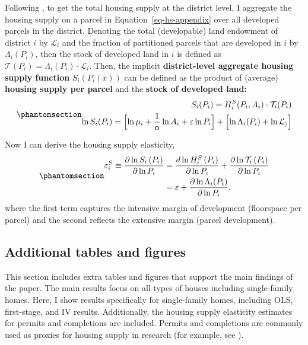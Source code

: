 \documentclass[
  12pt,
]{article}
\begin{document}
Following \citet{baum-snow_han_2019}, to get the total housing supply at
the district level, I aggregate the housing supply on a parcel in
Equation~\ref{eq-hs-appendix} over all developed parcels in the
district. Denoting the total (developable) land endowment of district
\(i\) by \(\mathcal{L}_{i}\) and the fraction of partitioned parcels
that are developed in \(i\) by \(\Lambda_i (P_i)\), then the stock of
developed land in \(i\) is defined as
\(\mathcal{T}(P_i) = \Lambda_i(P_i) \cdot \mathcal{L}_{i}\). Then, the
implicit \textbf{district-level aggregate housing supply function}
\(S_i(P_i(x))\) can be defined as the product of (average)
\textbf{housing supply per parcel} and the \textbf{stock of developed
land:} \begin{equation}\phantomsection\label{eq-agg-hs-appendix}{
\begin{aligned}
S_i(P_i) = H_i^S(P_i, A_i)\cdot \mathcal{T}_{i}(P_i)\\ 
\ln S_i(P_i) = \Bigl[\ln \mu_i + \frac{1}{\alpha}\ln A_i + \varepsilon\ln P_i \Bigr]+ \Bigl[\ln\Lambda_i(P_i) + \ln\mathcal{L_i}\Bigr]
\end{aligned}
}\end{equation}

Now I can derive the housing supply elasticity,
\begin{equation}\phantomsection\label{eq-elasticity-appendix}{
\begin{aligned}
\varepsilon^S_{i} \equiv \frac{\partial \ln S_{i}\left(P_{i}\right)}{\partial \ln P_{i}}&=\frac{d \ln H^S_{i}\left(P_{i}\right)}{\partial \ln P_{i}}+ \frac{\partial \ln \mathcal{T}_{i}\left(P_{i}\right)}{\partial \ln P_{i}} \\
&= \varepsilon + \frac{\partial \ln\Lambda_i(P_i)}{\partial \ln P_i},
\end{aligned}
}\end{equation} where the first term captures the intensive margin of
development (floorspace per parcel) and the second reflects the
extensive margin (parcel development).

\subsection{Additional tables and
figures}\label{additional-tables-and-figures}

This section includes extra tables and figures that support the main
findings of the paper. The main results focus on all types of houses
including single-family homes. Here, I show results specifically for
single-family homes, including OLS, first-stage, and IV results.
Additionally, the housing supply elasticity estimates for permits and
completions are included. Permits and completions are commonly used as
proxies for housing supply in research (for example, see
\citet{lerbs_2014}).
\end{document}
